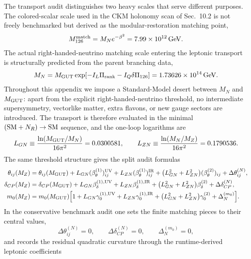\documentclass[11pt]{article}
\begin{document}
The transport audit distinguishes two heavy scales that serve different purposes. The colored-scalar scale used in the CKM holonomy scan of Sec.~10.2 is not freely benchmarked but derived as the modular-restoration matching point,
\begin{equation}
 M_{126}^{\rm match}
 =
 M_Ne^{-\beta^2}
 =
 7.99\times10^{12}\,\mathrm{GeV}.
\end{equation}
The actual right-handed-neutrino matching scale entering the leptonic transport is structurally predicted from the parent branching data,
\begin{equation}
 M_N
 =
 M_{\rm GUT}\exp\!\left[-I_L\Pi_{\rm rank}-I_Q\delta\Pi_{126}\right]
 = 1.73626\times10^{14}\,\mathrm{GeV}.
\end{equation}
Throughout this appendix we impose a Standard-Model desert between $M_N$ and $M_{\rm GUT}$: apart from the explicit right-handed-neutrino threshold, no intermediate supersymmetry, vectorlike matter, extra flavons, or new gauge sectors are introduced. The transport is therefore evaluated in the minimal $({\rm SM}+N_R)\rightarrow{\rm SM}$ sequence, and the one-loop logarithms are
\begin{equation}
 L_{GN}\equiv \frac{\ln(M_{\rm GUT}/M_N)}{16\pi^2}=0.0300581,
 \qquad
 L_{ZN}\equiv \frac{\ln(M_N/M_Z)}{16\pi^2}=0.1790536.
\end{equation}
The same threshold structure gives the split audit formulas
\begin{align}
 \theta_{ij}(M_Z)
 &= \theta_{ij}(M_{\rm GUT})
 + L_{GN}(\beta_{\theta}^{(1)})_{ij}^{\rm UV}
 + L_{ZN}(\beta_{\theta}^{(1)})_{ij}^{\rm IR}
 + \bigl(L_{GN}^2+L_{ZN}^2\bigr)(\beta_{\theta}^{(2)})_{ij}
 + \Delta\theta_{ij}^{(N)}, \\
 \delta_{CP}(M_Z)
 &= \delta_{CP}(M_{\rm GUT})
 + L_{GN}\beta_{\delta}^{(1),\rm UV}
 + L_{ZN}\beta_{\delta}^{(1),\rm IR}
 + \bigl(L_{GN}^2+L_{ZN}^2\bigr)\beta_{\delta}^{(2)}
 + \Delta\delta_{CP}^{(N)}, \\
 m_0(M_Z)
 &= m_0(M_{\rm GUT})\Bigl[1
 + L_{GN}\gamma_0^{(1),\rm UV}
 + L_{ZN}\gamma_0^{(1),\rm IR}
 + \bigl(L_{GN}^2+L_{ZN}^2\bigr)\gamma_0^{(2)}
 + \Delta_N^{(m_0)}\Bigr].
\end{align}
In the conservative benchmark audit one sets the finite matching pieces to their central values,
\begin{equation}
 \Delta\theta_{ij}^{(N)}=0,
 \qquad
 \Delta\delta_{CP}^{(N)}=0,
 \qquad
 \Delta_N^{(m_0)}=0,
\end{equation}
and records the residual quadratic curvature through the runtime-derived leptonic coefficients
\end{document}
